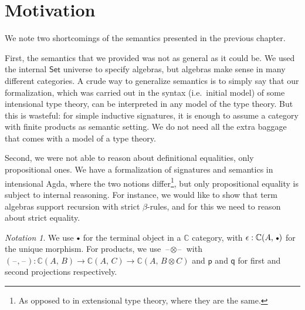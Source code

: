\documentclass[12pt,a4paper,twoside,openany]{book}
\theoremstyle{remark}
\newtheorem{notation}{Notation}
\theoremstyle{definition}
\theoremstyle{theorem}
\newcommand{\mbb}[1]{\mathbb{#1}}
\newcommand{\blank}{\mathord{\hspace{1pt}\text{--}\hspace{1pt}}}
\newcommand{\Set}{\mathsf{Set}}
\newcommand{\emptycon}{\scaleobj{.75}\bullet}
\newcommand{\p}{\mathsf{p}}
\newcommand{\q}{\mathsf{q}}
\begin{document}
\section{Motivation}
\label{sec:2ltt-motivation}
We note two shortcomings of the semantics presented in the
previous chapter.

First, the semantics that we provided was not as general as it could be. We
used the internal $\Set$ universe to specify algebras, but algebras make sense
in many different categories. A crude way to generalize semantics is to simply
say that our formalization, which was carried out in the syntax (i.e.\ initial
model) of some intensional type theory, can be interpreted in any model of the
type theory. But this is wasteful: for simple inductive signatures, it is
enough to assume a category with finite products as semantic setting. We do not
need all the extra baggage that comes with a model of a type theory.

Second, we were not able to reason about definitional equalities, only
propositional ones. We have a formalization of signatures and semantics in
intensional Agda, where the two notions differ\footnote{As opposed to in
extensional type theory, where they are the same.}, but only propositional
equality is subject to internal reasoning. For instance, we would like to show
that term algebras support recursion with strict $\beta$-rules, and for this we
need to reason about strict equality.

\begin{notation}
We use $\emptycon$ for the terminal object in a $\mbb{C}$ category, with
$\epsilon : \mbb{C}(A,\,\emptycon)$ for the unique morphism. For products, we
use $\blank\!\otimes\!\blank$ with $(\blank\!,\!\blank) : \mbb{C}(A,\,B) \to
\mbb{C}(A,\,C) \to \mbb{C}(A,\,B\otimes C)$ and $\p$ and $\q$ for
first and second projections respectively.
\end{notation}
\end{document}
